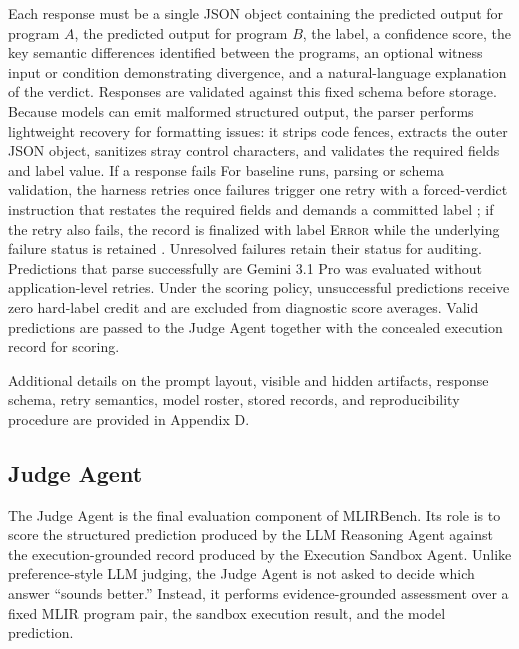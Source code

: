\documentclass[sigplan,screen,review,anonymous]{acmart}
\providecommand{\DIFadd}[1]{{\protect\color{blue} \sf #1}} %
\providecommand{\DIFdel}[1]{{\protect\color{red} \scriptsize #1}} %
\providecommand{\DIFaddbegin}{} %
\providecommand{\DIFaddend}{} %
\providecommand{\DIFdelbegin}{} %
\providecommand{\DIFdelend}{} %
\begin{document}
Each response must be a single JSON object containing the predicted output for program $A$, the predicted output for program $B$, the label, a confidence score, the key semantic differences identified between the programs, an optional witness input or condition demonstrating divergence, and a natural-language explanation of the verdict. Responses are validated against this fixed schema before storage. Because models can emit malformed structured output, the parser performs lightweight recovery for formatting issues: it strips code fences, extracts the outer JSON object, sanitizes stray control characters, and validates the required fields and label value. \DIFdelbegin \DIFdel{If a response fails }\DIFdelend \DIFaddbegin \DIFadd{For baseline runs, }\DIFaddend parsing or schema \DIFdelbegin \DIFdel{validation, the harness retries once }\DIFdelend \DIFaddbegin \DIFadd{failures trigger one retry }\DIFaddend with a forced-verdict instruction that restates the required fields and demands a committed label\DIFdelbegin \DIFdel{; if the retry also fails, the record is finalized with label \textsc{Error} while the underlying failure status is retained }\DIFdelend \DIFaddbegin \DIFadd{. Unresolved failures retain their status }\DIFaddend for auditing. \DIFdelbegin \DIFdel{Predictions that parse successfully are }\DIFdelend \DIFaddbegin \DIFadd{Gemini 3.1 Pro was evaluated without application-level retries. Under the scoring policy, unsuccessful predictions receive zero hard-label credit and are excluded from diagnostic score averages. Valid predictions are }\DIFaddend passed to the Judge Agent together with the concealed execution record for scoring.

Additional details on the prompt layout, visible and hidden artifacts, response schema, retry semantics, model roster, stored records, and reproducibility procedure are provided in Appendix D.


\subsection{Judge Agent}
\label{sec:judge_agent}

The Judge Agent is the final evaluation component of MLIRBench. Its role is to score the structured prediction produced by the LLM Reasoning Agent against the execution-grounded record produced by the Execution Sandbox Agent.
\DIFdelbegin \DIFdel{Unlike preference-style LLM judging, the Judge Agent is not asked to decide which answer ``sounds better.'' Instead, it performs evidence-grounded assessment over a fixed MLIR program pair, the sandbox execution result, and the model prediction.
}\DIFdelend 
\end{document}
